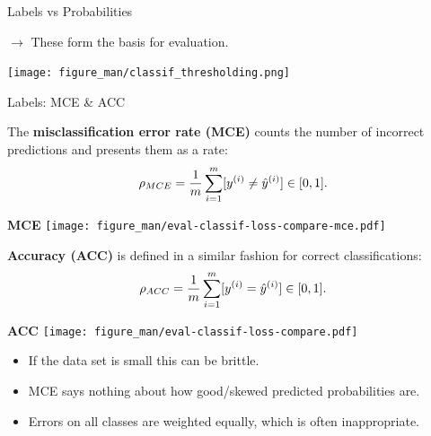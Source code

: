 \documentclass[11pt,compress,t,notes=noshow, xcolor=table]{beamer}
\begin{document}
\begin{vbframe}{Labels vs Probabilities}
\vfill

$\rightarrow$ These form the basis for evaluation.

\vfill

  \texttt{[image: figure\_man/classif\_thresholding.png]}


\end{vbframe}


\begin{vbframe}{Labels: MCE \& ACC}

\begin{minipage}[t]{0.75\textwidth} 
  \small
  The \textbf{misclassification error rate (MCE)} counts the number of incorrect 
  predictions and presents them as a rate:
  $$ \rho_{MCE} = \frac{1}{m} \sum_{i = 1}^m [y^{(i)} \neq \hat{y}^{(i)}] \in [0, 1]. $$
\end{minipage}%
\begin{minipage}[t]{0.25\textwidth}
  \centering
  \begin{center}
    \textbf{MCE}
    \texttt{[image: figure\_man/eval-classif-loss-compare-mce.pdf]}
  \end{center}
\end{minipage}

\lz

\begin{minipage}[t]{0.75\textwidth} 
  \small
  \textbf{Accuracy (ACC)} is defined in a similar fashion for correct 
  classifications:
  $$ \rho_{ACC} = \frac{1}{m} \sum_{i = 1}^m [y^{(i)} = \hat{y}^{(i)}] \in [0, 1]. $$
\end{minipage}%
\begin{minipage}[t]{0.25\textwidth}
  \centering
  \begin{center}
    \textbf{ACC}
    \texttt{[image: figure\_man/eval-classif-loss-compare.pdf]}
  \end{center}
\end{minipage}

\lz

\begin{itemize}
  \small
  \item If the data set is small this can be brittle.
  \item MCE says nothing about how good/skewed predicted probabilities are.
  \item Errors on all classes are weighted equally, which is often 
  inappropriate.
\end{itemize}

\end{vbframe}
\end{document}
